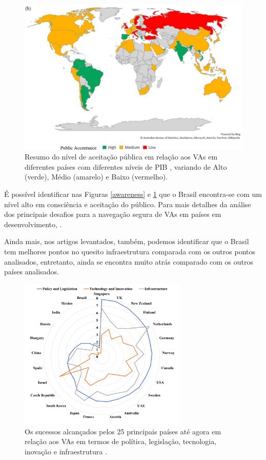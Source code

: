 \begin{figure}[H]
\centering
\includegraphics[width=12cm]{Figures/grafik-b.png}
\caption{Resumo do nível de aceitação pública em relação aos VAs em diferentes países com diferentes níveis de PIB \cite{mundobrasil}, variando de Alto (verde), Médio (amarelo) e Baixo (vermelho).}
\label{public}
\end{figure}

É possível identificar nas Figuras \ref{awareness} e \ref{public} que o Brasil encontra-se com um nível alto em consciência e aceitação do público. Para mais detalhes da análise dos principais desafios para a navegação segura de VAs em países em desenvolvimento, \cite{mundobrasil}.

Ainda mais, nos artigos levantados, também, podemos identificar que o Brasil tem melhores pontos no quesito infraestrutura comparada com os outros pontos analisados, entretanto, ainda se encontra muito atrás comparado com os outros países analisados.

\begin{figure}[H]
\centering
\includegraphics[width=8cm]{Figures/future.png}
\caption{Os sucessos alcançados pelos 25 principais países até agora em relação aos VAs em termos de política, legislação, tecnologia, inovação e infraestrutura \cite{future-view}.}
\label{figura_future-view}
\end{figure}



